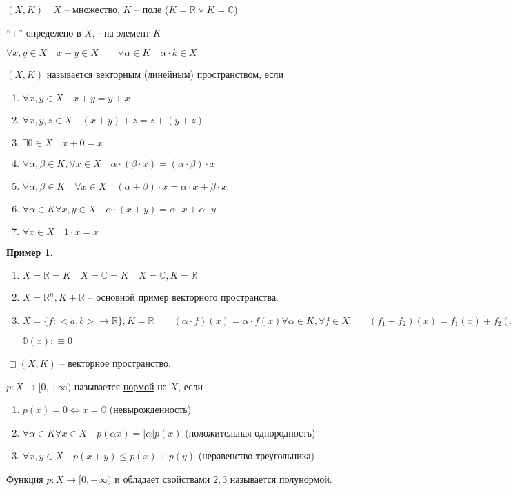 \documentclass{book}
\newcommand\R{\ensuremath{\mathbb{R}}}
\renewcommand\C{\ensuremath{\mathbb{C}}}
\theoremstyle{definition}
\newtheorem*{example}{Пример}
\begin{document}
    \begin{definition}
        $(X,K)\quad X$ -- множество, $K$ -- поле ($K = \R\lor K = \C$)

        ``+'' определено в $X$, $\cdot $ на элемент $K$

        $\forall x, y\in X\quad x+y\in X\qquad \forall \alpha \in K\quad \alpha\cdot k \in X$

        $(X,K)$ называется векторным (линейным) пространством, если
        \begin{enumerate}
            \item $\forall x, y\in X\quad x+y = y+x$
            \item $\forall x, y, z\in X\quad (x+y)+z = z + (y+z)$
            \item $\exists 0\in X\quad x+0=x$
            \item $\forall \alpha, \beta \in K, \forall x\in X\quad \alpha\cdot \left( \beta\cdot x \right)  = (\alpha\cdot \beta)\cdot x$
            \item $\forall \alpha, \beta\in K\quad \forall x\in X\quad (\alpha+\beta)\cdot x = \alpha\cdot x + \beta\cdot x$
            \item $\forall \alpha\in K\forall x, y\in X\quad \alpha\cdot (x+y) = \alpha\cdot x + \alpha\cdot y$
            \item $\forall x\in X\quad 1\cdot x = x$
        \end{enumerate}
    \end{definition}

    \begin{example}
        \begin{enumerate}
            \item $X=\R=K\quad X = \C = K\quad X=\C, K=\R$
            \item $X = \R^n, K+\R$ -- основной пример векторного пространства.
            \item $X = \{f:<a,b> \to \R\}, K = \R\qquad (\alpha\cdot f)(x) = \alpha\cdot f(x) \forall \alpha\in K, \forall f\in X\qquad (f_1+f_2)(x) = f_1(x) + f_2(x)$

                $\mathbb{0}(x):\equiv 0$
        \end{enumerate}
    \end{example}

    \begin{definition}
        $\sqsupset (X,K)$ -- векторное пространство.

        $p:X \to [0,+\infty )$ называется \underline{нормой} на $X$, если
        \begin{enumerate}
            \item $p(x) = 0 \iff  x = \mathbb{0}$ (невырожденность)
            \item $\forall \alpha\in K\forall x\in X\quad p(\alpha x) = \left| \alpha \right| p(x)$ (положительная однородность)
            \item $\forall x, y\in X\quad p(x+y)\leqslant p(x) + p(y)$ (неравенство треугольника)
        \end{enumerate}

        Функция $p:X\to [0,+\infty )$ и обладает свойствами $2, 3$ называется полунормой.
    \end{definition}
\end{document}
